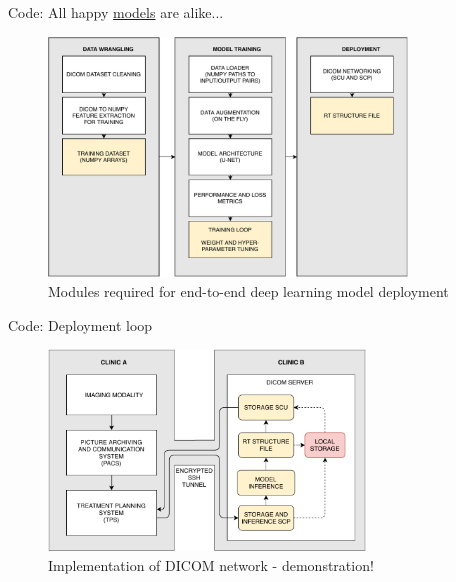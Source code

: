 \documentclass[9pt]{beamer}
\begin{document}
\begin{frame}{Code: All happy \underline{models} are alike...}
\begin{figure}
\includegraphics[width=0.85\textwidth]{images/modules}
\caption{Modules required for end-to-end deep learning model deployment}
\end{figure}
\end{frame}
%

\begin{frame}{Code: Deployment loop}
\begin{figure}
\includegraphics[width=0.75\textwidth]{images/dicom_networking}
\caption{Implementation of DICOM network - demonstration!}
\end{figure}
\end{frame}
%
\end{document}
